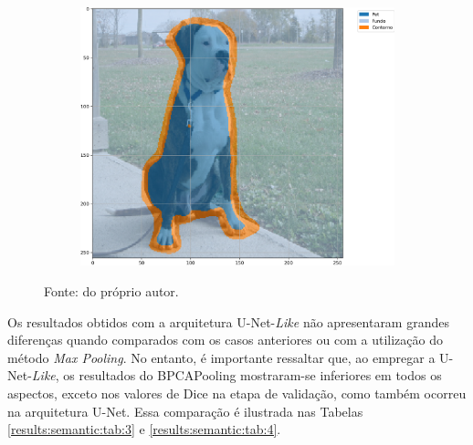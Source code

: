 \begin{figure}[H]
\begin{subfigure}[t]{0.32\textwidth}
         \label{results:fig:semantic:5.2}
     \end{subfigure}%
     ~ 
    \begin{subfigure}[t]{0.32\textwidth}
         \centering
         \includegraphics[width=1\linewidth]{recursos/imagens/results/bpca_acc_unet500_image_2_overlayed_segmentation.png}
         \label{results:fig:semantic:5.3}
     \end{subfigure}%

    Fonte: do próprio autor.
\end{figure}

Os resultados obtidos com a arquitetura U-Net-\textit{Like} não apresentaram grandes diferenças quando comparados com os casos anteriores ou com a utilização do método \textit{Max Pooling}. No entanto, é importante ressaltar que, ao empregar a U-Net-\textit{Like}, os resultados do BPCAPooling mostraram-se inferiores em todos os aspectos, exceto nos valores de Dice na etapa de validação, como também ocorreu na arquitetura U-Net. Essa comparação é ilustrada nas Tabelas \ref{results:semantic:tab:3} e \ref{results:semantic:tab:4}.

